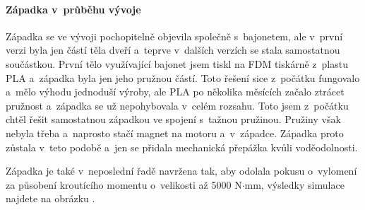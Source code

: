 \paragraph{Západka v~průběhu vývoje}

Západka se ve vývoji pochopitelně objevila společně s~bajonetem, ale v~první verzi byla jen částí těla dveří a~teprve v~dalších verzích se stala
samostatnou součástkou. První tělo využívající bajonet jsem tiskl na FDM tiskárně z~plastu PLA a~západka byla jen jeho pružnou částí. Toto řešení sice 
z~počátku fungovalo a~mělo výhodu jednoduší výroby, ale PLA po několika měsících začalo ztrácet pružnost a~západka se už nepohybovala v~celém rozsahu.
Toto jsem z~počátku chtěl řešit samostatnou západkou ve spojení s~tažnou pružinou. Pružiny však nebyla třeba a~naprosto stačí magnet na motoru a~v~západce.
Západka proto zůstala v~teto podobě a~jen se přidala mechanická přepážka kvůli voděodolnosti. 

Západka je také v~neposlední řadě navržena tak, aby odolala pokusu o~vylomení za působení kroutícího momentu o~velikosti až 5000 N$\cdot$mm, výsledky simulace najdete 
na obrázku .
